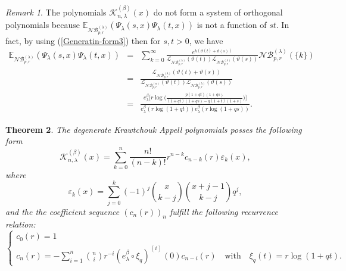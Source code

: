 \documentclass{birkjour}
\newtheorem{thm}{Theorem}[section]
\theoremstyle{definition}
\theoremstyle{remark}
\newtheorem{rem}[thm]{Remark}
\numberwithin{equation}{section}
\begin{document}
\begin{rem}
The polynomials $\mathcal{K}^{(\beta)}_{n, \lambda}(x)$ do not form
a system of orthogonal polynomials because
$\mathbb{E}_{\mathcal{NB}^{(\lambda)}_{p, r}}(\Psi_{\lambda}(s,
x)\Psi_{\lambda}(t, x))$ is not a function of $st$. In fact, by
using (\ref{Generatin-form3}) then for $s, t>0$, we have
\begin{eqnarray}\label{Eq1}
\mathbb{E}_{\mathcal{NB}^{(\lambda)}_{p, r}}(\Psi_{\lambda}(s,
x)\Psi_{\lambda}(t, x))
&=&\displaystyle{\sum^{\infty}_{k=0}\frac{e^{k(\vartheta(t)+\vartheta(s))}}{\mathcal{L}_{\mathcal{N}\mathcal{B}^{(\lambda)}_{p,
r}}(\vartheta(t))
\mathcal{L}_{\mathcal{N}\mathcal{B}^{(\lambda)}_{p, r}}(\vartheta(s))}\mathcal{NB}^{(\lambda)}_{p, r}(\{k\})}\nonumber\\
&=&\displaystyle{\frac{\mathcal{L}_{\mathcal{N}\mathcal{B}^{(\lambda)}_{p,
r}}(\vartheta(t)+\vartheta(s))}
{\mathcal{L}_{\mathcal{N}\mathcal{B}^{(\alpha)}_{p, r}}(\vartheta(t))
\mathcal{L}_{\mathcal{N}\mathcal{B}^{(\lambda)}_{p, r}}(\vartheta(s))}}\nonumber\\
&=&\displaystyle{\frac{e^{\beta}_{\lambda}\Big[r\log\big(\frac{p(1+qt)(1+qs)}{(1+qt)(1+qs)
-q(1+t)(1+s)}\big)\Big]}{e^{\beta}_{\lambda}(r\log(1+qt))e^{\beta}_{\lambda}(r\log(1+qs))}}.
\end{eqnarray}
\end{rem}
\begin{thm}
The degenerate Krawtchouk Appell polynomials posses the following
form
\begin{equation}\label{Fractional-Krawtchouk-poly}
\mathcal{K}^{(\beta)}_{n,
\lambda}(x)=\displaystyle{\sum^{n}_{k=0}\frac{n!}{(n-k)!}r^{n-k}c_{n-k}(r)\varepsilon_{k}(x)},
\end{equation}
where
\begin{equation}\label{def-omega}
\varepsilon_{k}(x)=\displaystyle{\sum^{k}_{j=0}(-1)^{j}
\binom{x}{k-j}\binom{x+j-1}{k-j}q^{j}},
\end{equation}
and the the coefficient sequence $(c_{n}(r))_{n}$ fulfill the
following recurrence relation:
$$\begin{cases}
c_{0}(r)=1\\
c_{n}(r)=-\displaystyle{\sum^{n}_{i=1}
\binom{n}{i}r^{-i}(e^{\beta}_{\lambda}\circ
\xi_{q})^{(i)}(0)c_{n-i}(r) }\quad\text{with}\quad
\xi_{q}(t)=r\log(1+qt).
\end{cases}
$$
\end{thm}
\end{document}

